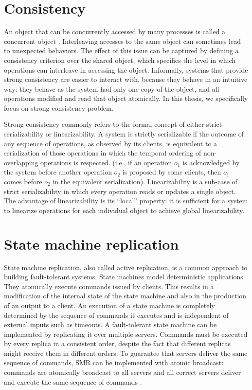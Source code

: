 \section{Consistency}
An object that can be concurrently accessed by many processes is called a
concurrent object \cite{linearizability}. Interleaving accesses to the same
object can sometimes lead to unexpected behaviors. The effect of this issue can
be captured by defining a consistency criterion over the shared object, which
specifies the level in which operations can interleave in accessing the object.
Informally, systems that provide strong consistency are easier to interact with,
because they behave in an intuitive way: they behave as the system had only one
copy of the object, and all operations modified and read that object atomically.
In this thesis, we specifically focus on strong consistency problem.

Strong consistency commonly refers to the formal concept of either strict
serializability or linearizability. A system is strictly serializable if the
outcome of any sequence of operations, as observed by its clients, is equivalent
to a serialization of those operations in which the temporal ordering of
non-overlapping operations is respected. (i.e., if an operation \emph{$o_1$} is
acknowledged by the system before another operation \emph{$o_2$} is proposed by
some clients, then \emph{$o_1$} comes before \emph{$o_2$} in the equivalent
serialization). Linearizability is a sub-case of strict serializability in which
every operation reads or updates a single object. The advantage of
linearizability is its ``local'' property: it is sufficient for a system to
linearize operations for each individual object to achieve global
linearizability.

\section{State machine replication}
\label{sec:smr}
State machine replication, also called active replication, is a common approach
to building fault-tolerant systems\cite{Lam78, Sch90}. State machines model
deterministic applications. They atomically execute commands issued by clients.
This results in a modification of the internal state of the state machine and
also in the production of an output to a client. An execution of a state machine
is completely determined by the sequence of commands it executes and is
independent of external inputs such as timeouts. A fault-tolerant state machine
can be implemented by replicating it over multiple servers. Commands must be
executed by every replica in a consistent order, despite the fact that different
replicas might receive them in different orders. To guarantee that servers
deliver the same sequence of commands, SMR can be implemented with atomic
broadcast: commands are atomically broadcast to all servers and all correct
servers deliver and execute the same sequence of commands \cite{BJ87b,DSU04}.

